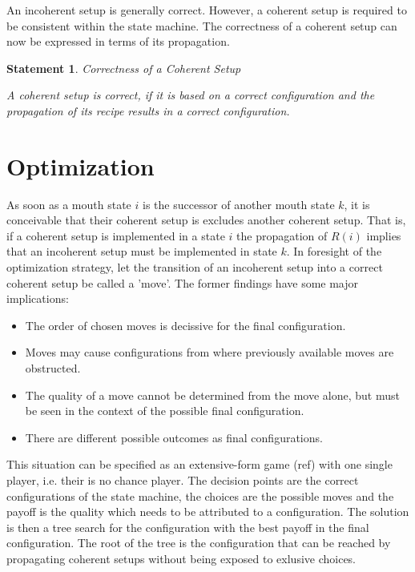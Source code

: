 \documentclass[12pt,a4paper]{scrartcl}
\newtheorem{statement}{Statement}
\begin{document}
An incoherent setup is generally correct. However, a coherent setup is required
to be consistent within the state machine. The correctness of a coherent setup
can now be expressed in terms of its propagation.

\begin{statement} Correctness of a Coherent Setup

    A coherent setup is correct, if it is based on a correct configuration and 
    the propagation of its recipe results in a correct configuration.
    
\end{statement}

\section{Optimization}

As soon as a mouth state $i$ is the successor of another mouth state $k$, it is
conceivable that their coherent setup is excludes another coherent setup. That
is, if a coherent setup is implemented in a state $i$ the propagation of $R(i)$
implies that an incoherent setup must be implemented in state $k$.  In
foresight of the optimization strategy, let the transition of an incoherent
setup into a correct coherent setup be called a 'move'.  The former findings
have some major implications:

\begin{itemize}
    \item The order of chosen moves is decissive for the final configuration.

    \item Moves may cause configurations from where previously available 
          moves are obstructed.

    \item The quality of a move cannot be determined from the move alone, but
          must be seen in the context of the possible final configuration.

    \item There are different possible outcomes as final configurations.
          
\end{itemize}

This situation can be specified as an extensive-form game (ref) with one single
player, i.e. their is no chance player. The decision points are the correct
configurations of the state machine, the choices are the possible moves and the
payoff is the quality which needs to be attributed to a configuration. The solution
is then a tree search for the configuration with the best payoff in the final
configuration. The root of the tree is the configuration that can be reached
by propagating coherent setups without being exposed to exlusive choices.
\end{document}
